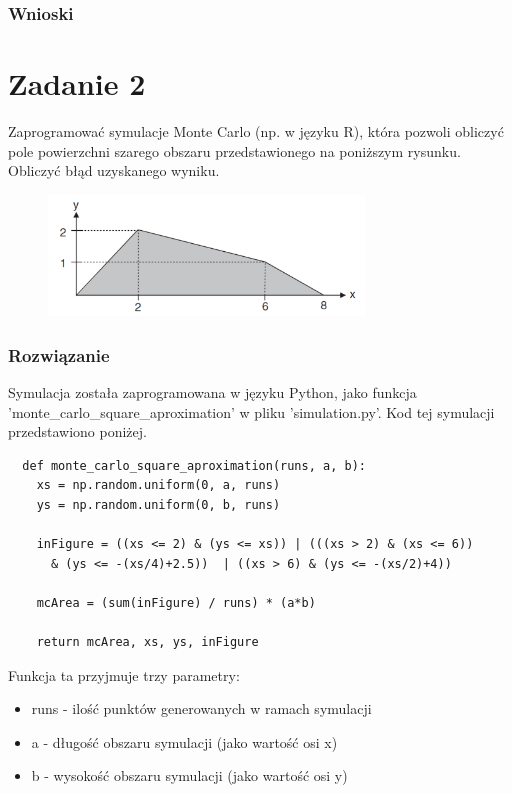 \documentclass[12pt,oneside,a4paper]{book} %
\theoremstyle{break}
\begin{document}
\subsection*{Wnioski}

\chapter*{Zadanie 2}

Zaprogramować symulacje Monte Carlo (np. w języku R), która pozwoli obliczyć pole powierzchni szarego obszaru przedstawionego na poniższym rysunku. Obliczyć błąd uzyskanego wyniku.

\begin{figure}[H]
  \centering
  \includegraphics[width=0.75\textwidth]{figure_from_instruction.png}
\end{figure}

\subsection*{Rozwiązanie}

Symulacja została zaprogramowana w języku Python, jako funkcja\\ 'monte\_carlo\_square\_aproximation' w pliku 'simulation.py'.
Kod tej symulacji przedstawiono poniżej.
\begin{verbatim}
  def monte_carlo_square_aproximation(runs, a, b):
    xs = np.random.uniform(0, a, runs)
    ys = np.random.uniform(0, b, runs)

    inFigure = ((xs <= 2) & (ys <= xs)) | (((xs > 2) & (xs <= 6)) 
      & (ys <= -(xs/4)+2.5))  | ((xs > 6) & (ys <= -(xs/2)+4))

    mcArea = (sum(inFigure) / runs) * (a*b)

    return mcArea, xs, ys, inFigure
\end{verbatim}

Funkcja ta przyjmuje trzy parametry:
\begin{itemize}
  \item runs - ilość punktów generowanych w ramach symulacji
  \item a - długość obszaru symulacji (jako wartość osi x)
  \item b - wysokość obszaru symulacji (jako wartość osi y)
\end{itemize}
\end{document}
